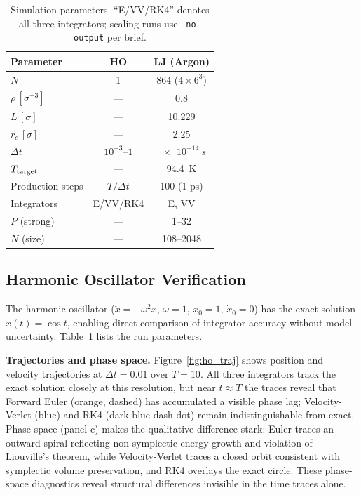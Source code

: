 \documentclass[10pt,twocolumn]{article}
\begin{document}
\begin{table}[t]
  \centering
  \caption{Simulation parameters. ``E/VV/RK4'' denotes all three integrators;
    scaling runs use \texttt{--no-output} per brief.}
  \label{tab:params}
  \small
  \setlength{\tabcolsep}{4pt}
  \begin{tabular}{@{}lcc@{}}
    \toprule
    Parameter & HO & LJ (Argon) \\
    \midrule
    $N$               & 1         & 864 ($4\times6^3$) \\
    $\rho\,[\sigma^{-3}]$ & ---    & 0.8 \\
    $L\,[\sigma]$      & ---       & 10.229 \\
    $r_c\,[\sigma]$    & ---       & 2.25 \\
    $\Delta t$         & $10^{-3}$--$1$ & $\SI{e-14}{s}$ \\
    $T_{\rm target}$   & ---       & \SI{94.4}{K} \\
    Production steps   & $T/\Delta t$ & 100 (1 ps) \\
    Integrators        & E/VV/RK4  & E, VV \\
    $P$ (strong)       & ---       & 1--32 \\
    $N$ (size)         & ---       & 108--2048 \\
    \bottomrule
  \end{tabular}
\end{table}

\subsection{Harmonic Oscillator Verification}
\label{sec:ho}

The harmonic oscillator ($\ddot{x} = -\omega^2 x$, $\omega=1$, $x_0=1$,
$\dot{x}_0=0$) has the exact solution $x(t)=\cos t$, enabling direct
comparison of integrator accuracy without model uncertainty.
Table~\ref{tab:params} lists the run parameters.

\textbf{Trajectories and phase space.}
Figure~\ref{fig:ho_traj} shows position and velocity trajectories at
$\Delta t=0.01$ over $T=10$.
All three integrators track the exact solution closely at this resolution,
but near $t\approx T$ the traces reveal that Forward Euler (orange, dashed)
has accumulated a visible phase lag; Velocity-Verlet (blue) and RK4
(dark-blue dash-dot) remain indistinguishable from exact.
Phase space (panel c) makes the qualitative difference stark: Euler traces
an outward spiral reflecting non-symplectic energy growth and violation of
Liouville's theorem, while Velocity-Verlet traces a closed orbit
consistent with symplectic volume preservation, and RK4 overlays the exact
circle.
These phase-space diagnostics reveal structural differences invisible in the
time traces alone.
\end{document}
